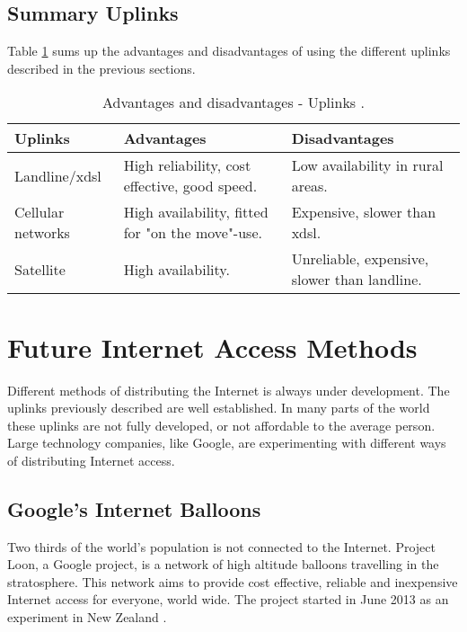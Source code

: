 \subsection{Summary Uplinks}

Table \ref{tab:uplinks} sums up the advantages and disadvantages of using the different uplinks described in the previous sections. 

\begin{center}
\begin{table}[!h]
\caption{\label{tab:uplinks}Advantages and disadvantages - Uplinks \cite{comparisonuplinks}.}
    \begin{tabular}{ | l | p{4cm} | p{5cm} |}
    \hline
    \textbf{Uplinks} & \textbf{Advantages} & \textbf{Disadvantages} \\ 
    \hline
    Landline/x\gls{dsl} & High reliability, cost effective, good speed. & Low availability in rural areas. \\ 
    \hline
     Cellular networks & High availability, fitted for "on the move"-use. & Expensive, slower than x\gls{dsl}.\\
    \hline
    Satellite & High availability.  & Unreliable, expensive, slower than landline.\\ 
    \hline
    \end{tabular}
   \end{table}
\end{center}


\section{Future Internet Access Methods}
Different methods of distributing the Internet is always under development. The uplinks previously described are well established. In many parts of the world these uplinks are not fully developed, or not affordable to the average person. Large technology companies, like Google, are experimenting with different ways of distributing Internet access. 

\subsection{Google's Internet Balloons}
Two thirds of the world's population is not connected to the Internet. Project Loon, a Google project, is a network of high altitude balloons travelling in the stratosphere. This network aims to provide cost effective, reliable and inexpensive Internet access for everyone, world wide. The project started in June 2013 as an experiment in New Zealand \cite{loon}. 

